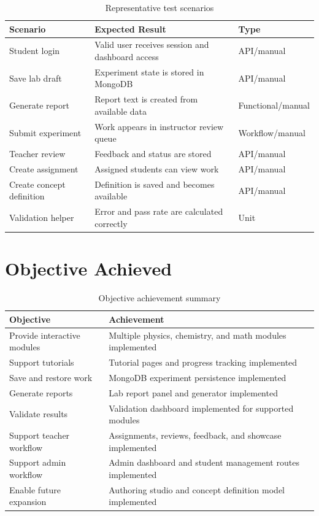 \documentclass[12pt,a4paper]{report}
\begin{document}
\begin{table}[H]
\centering
\caption{Representative test scenarios}
\begin{tabular}{p{} p{} p{}}
\toprule
\textbf{Scenario} & \textbf{Expected Result} & \textbf{Type} \\
\midrule
Student login & Valid user receives session and dashboard access & API/manual \\
Save lab draft & Experiment state is stored in MongoDB & API/manual \\
Generate report & Report text is created from available data & Functional/manual \\
Submit experiment & Work appears in instructor review queue & Workflow/manual \\
Teacher review & Feedback and status are stored & API/manual \\
Create assignment & Assigned students can view work & API/manual \\
Create concept definition & Definition is saved and becomes available & API/manual \\
Validation helper & Error and pass rate are calculated correctly & Unit \\
\bottomrule
\end{tabular}
\end{table}

\section{Objective Achieved}
\begin{table}[H]
\centering
\caption{Objective achievement summary}
\begin{tabular}{p{} p{}}
\toprule
\textbf{Objective} & \textbf{Achievement} \\
\midrule
Provide interactive modules & Multiple physics, chemistry, and math modules implemented \\
Support tutorials & Tutorial pages and progress tracking implemented \\
Save and restore work & MongoDB experiment persistence implemented \\
Generate reports & Lab report panel and generator implemented \\
Validate results & Validation dashboard implemented for supported modules \\
Support teacher workflow & Assignments, reviews, feedback, and showcase implemented \\
Support admin workflow & Admin dashboard and student management routes implemented \\
Enable future expansion & Authoring studio and concept definition model implemented \\
\bottomrule
\end{tabular}
\end{table}
\end{document}
